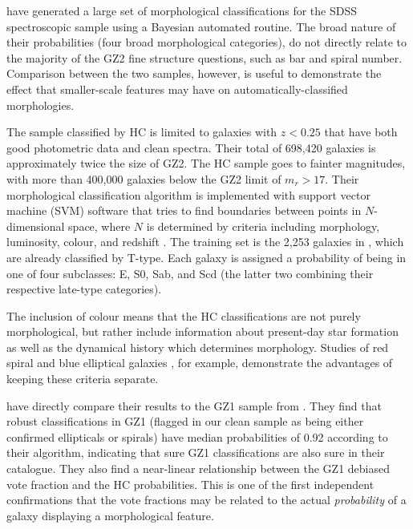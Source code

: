 \documentclass[useAMS,usenatbib]{mn2e}
\begin{document}
\citet[][HC]{hue11} have generated a large set of morphological classifications for the SDSS spectroscopic sample using a Bayesian automated routine. The broad nature of their probabilities (four broad morphological categories), do not directly relate to the majority of the GZ2 fine structure questions, such as bar and spiral number. Comparison between the two samples, however, is useful to demonstrate the effect that smaller-scale features may have on automatically-classified morphologies.

The sample classified by HC is limited to galaxies with $z<0.25$ that have both good photometric data and clean spectra. Their total of 698,420 galaxies is approximately twice the size of GZ2. The HC sample goes to fainter magnitudes, with more than 400,000 galaxies below the GZ2 limit of $m_r>17$. Their morphological classification algorithm is implemented with support vector machine (SVM) software that tries to find boundaries between points in $N$-dimensional space, where $N$ is determined by criteria including morphology, luminosity, colour, and redshift \citep{hue08}. The training set is the 2,253 galaxies in \citet{fuk07}, which are already classified by T-type. Each galaxy is assigned a probability of being in one of four subclasses: E, S0, Sab, and Scd (the latter two combining their respective late-type categories). 

The inclusion of colour means that the HC classifications are not purely morphological, but rather include information about present-day star formation as well as the dynamical history which determines morphology. Studies of red spiral \citep{mas10a} and blue elliptical galaxies \citep{sch09}, for example, demonstrate the advantages of keeping these criteria separate. 

\citet{hue11} have directly compare their results to the GZ1 sample from \citet{lin11}. They find that robust classifications in GZ1 (flagged in our clean sample as being either confirmed ellipticals or spirals) have median probabilities of 0.92 according to their algorithm, indicating that sure GZ1 classifications are also sure in their catalogue. They also find a near-linear relationship between the GZ1 debiased vote fraction and the HC probabilities. This is one of the first independent confirmations that the vote fractions may be related to the actual {\em probability} of a galaxy displaying a morphological feature. 

\end{document}
